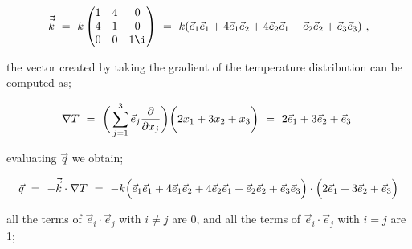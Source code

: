 \documentclass{article}
\begin{document}
\begin{equation} \label{eq:1}
\vec{\vec{k}} \hspace{0.125cm} = \hspace{0.125cm} k \begin{pmatrix} 
1 & 4 & 0 \\
4 & 1 & 0 \\
0 & 0 & 1 \i
\end{pmatrix} \hspace{0.125cm} = \hspace{0.125cm} k ( \vec{e}_1\vec{e}_1 + 4 \vec{e}_1\vec{e}_2 + 4 \vec{e}_2\vec{e}_1 + \vec{e}_2\vec{e}_2 + \vec{e}_3\vec{e}_3 ) \hspace{0.125cm} ,
\end{equation}

the vector created by taking the gradient of the temperature distribution can be computed as;

\begin{equation} \label{eq:1}
\nabla{T} \hspace{0.125cm} = \hspace{0.125cm} \bigg( \sum_{j=1}^{3} \vec{e}_j \frac{\partial}{\partial{x_j}} \bigg) \bigg( 2 x_1 + 3 x_2 + x_3 \bigg)  \hspace{0.125cm} = \hspace{0.125cm} 2\vec{e}_1 + 3\vec{e}_2 + \vec{e}_3 \hspace{0.125cm}
\end{equation}

evaluating \begin{math} \vec{q} \end{math} we obtain;

\begin{equation} \label{eq:1}
\vec{q} \hspace{0.125cm} = \hspace{0.125cm} -\vec{\vec{k}} \cdot \nabla{T} \hspace{0.125cm} = \hspace{0.125cm} - k \Big( \vec{e}_1\vec{e}_1 + 4 \vec{e}_1\vec{e}_2 + 4 \vec{e}_2\vec{e}_1 + \vec{e}_2\vec{e}_2 + \vec{e}_3\vec{e}_3 \Big) \cdot \Big( 2\vec{e}_1 + 3\vec{e}_2 + \vec{e}_3 \Big)
\end{equation}

all the terms of \begin{math} \vec{e}_i \cdot \vec{e}_j  \end{math} with \begin{math} i \neq j \end{math} are 0, and all the terms of \begin{math} \vec{e}_i \cdot \vec{e}_j  \end{math} with \begin{math} i = j \end{math} are 1;
\end{document}
